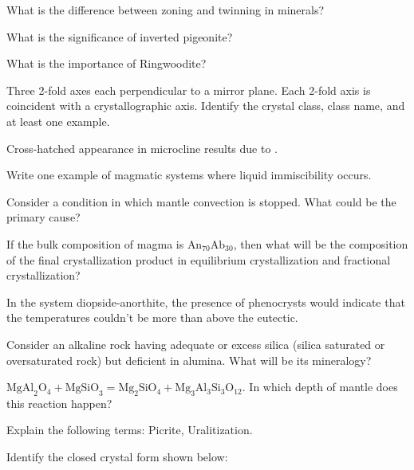 \documentclass[11pt,a4paper]{article}
\begin{document}
\begin{parts}
  \item What is the difference between zoning and twinning in minerals?
  \item What is the significance of inverted pigeonite?
  \item What is the importance of Ringwoodite?
  \item Three 2-fold axes each perpendicular to a mirror plane. Each 2-fold axis is coincident with a crystallographic axis. Identify the crystal class, class name, and at least one example.
  \item Cross-hatched appearance in microcline results due to \underline{\hspace{4cm}}.
  \item Write one example of magmatic systems where liquid immiscibility occurs.
  \item Consider a condition in which mantle convection is stopped. What could be the primary cause?
  \item If the bulk composition of magma is $ \text{An}_{70} \text{Ab}_{30}$, then what will be the composition of the final crystallization product in equilibrium crystallization and fractional crystallization?
  \item In the system diopside-anorthite, the presence of phenocrysts would indicate that the temperatures couldn't be more than \underline{\hspace{2cm}} above the eutectic.
  \item Consider an alkaline rock having adequate or excess silica (silica saturated or oversaturated rock) but deficient in alumina. What will be its mineralogy?
  \item $ \text{MgAl}_2 \text{O}_4 +  \text{MgSiO}_3 =  \text{Mg}_2 \text{SiO}_4 +  \text{Mg}_3 \text{Al}_3 \text{Si}_3 \text{O}_{12}$. In which depth of mantle does this reaction happen?
  \item Explain the following terms: Picrite, Uralitization.
  \item Identify the closed crystal form shown below:
  
\begin{center}
    
  \end{center}
\end{parts}
\end{document}
